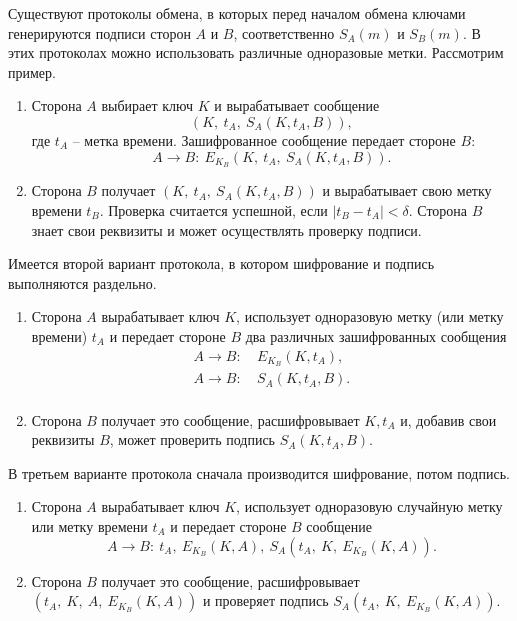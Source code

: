 \documentclass[10pt,a4paper]{book}
\begin{document}
Существуют протоколы обмена, в которых перед началом обмена ключами генерируются подписи сторон $A$ и $B$, соответственно $S_A(m)$ и $S_B(m)$. В этих протоколах можно использовать различные одноразовые метки. Рассмотрим пример.
\begin{enumerate}
    \item Сторона $A$ выбирает ключ $K$ и вырабатывает сообщение
            \[ \left( K, ~ t_A, ~ S_A(K, t_A, B) \right), \]
        где $t_A$ -- метка времени. Зашифрованное сообщение передает стороне $B$:
        \[ A \rightarrow B: ~ E_{K_B}(K, ~ t_A, ~ S_A(K, t_A, B)). \]
    \item Сторона $B$ получает $\left( K, ~ t_A, ~ S_A(K, t_A, B) \right)$ и вырабатывает свою метку времени $t_B$. Проверка считается успешной, если $|t_B - t_A | < \delta $. Сторона $B$ знает свои реквизиты и может осуществлять проверку подписи.
\end{enumerate}

Имеется второй вариант протокола, в котором шифрование и подпись выполняются раздельно.
\begin{enumerate}
    \item Сторона $A$ вырабатывает ключ $K$, использует одноразовую метку (или метку времени) $t_{A}$ и передает стороне $B$ два различных зашифрованных сообщения
            \[ \begin{array}{ll}
                A \rightarrow B: & ~ E_{K_B}(K, t_A), \\
                A \rightarrow B: & ~ S_A(K, t_A, B). \\
            \end{array} \]
    \item Сторона $B$ получает это сообщение, расшифровывает $K, t_A$ и, добавив свои реквизиты $B$, может проверить подпись $S_A(K, t_A, B)$.
\end{enumerate}

В третьем варианте протокола сначала производится шифрование, потом подпись.
\begin{enumerate}
    \item Сторона $A$ вырабатывает ключ $K$, использует одноразовую случайную метку или метку времени $t_A$ и передает стороне $B$ сообщение
        \[ A \rightarrow B: ~ t_A, ~ E_{K_B}(K, A), ~ S_A(t_A, ~ K, ~ E_{K_B}(K, A)). \]
    \item Сторона $B$ получает это сообщение, расшифровывает $\left( t_A, ~ K, ~ A, ~ E_{K_B}(K, A) \right)$ и проверяет подпись $S_A(t_A, ~ K, ~ E_{K_B}(K, A))$.
\end{enumerate}
\end{document}
